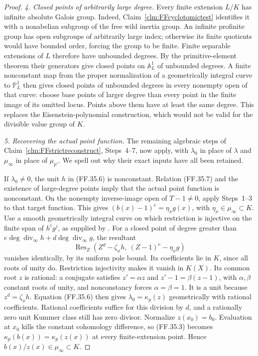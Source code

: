 \begin{proof}
\emph{4. Closed points of arbitrarily large degree.}
Every finite extension \(L/K\) has infinite
absolute Galois group. Indeed,
Claim~\ref{clm:FFcyclotomictest} identifies it
with a nonabelian subgroup of the free wild
inertia group. An infinite profinite group
has open subgroups of arbitrarily large
index; otherwise its finite quotients would
have bounded order, forcing the group to
be finite. Finite separable extensions of
\(L\) therefore have unbounded degrees.
By the primitive-element theorem their
generators give closed points on
\(\mathbb A^1_L\) of unbounded degrees.
A finite nonconstant map from the proper
normalization of a geometrically integral
curve to \(\mathbb P^1_L\) then gives
closed points of unbounded degrees in
every nonempty open of that curve: choose
base points of larger degree than every
point in the finite image of its omitted
locus. Points above them have at least
the same degree. This replaces the
Eisenstein-polynomial construction, which
would not be valid for the divisible
value group of \(K\).

\emph{5. Recovering the actual point function.}
The remaining algebraic steps of
Claim~\ref{clm:FFstrictreconstruct}, Steps~4--7,
now apply, with \(\lambda_0\) in place of
\(\lambda\) and \(\mu_\infty\) in place of
\(\mu_{p'}\). We spell out why their exact
inputs have all been retained.

If \(\lambda_0\ne0\), the unit \(h\) in
(FF.35.6) is nonconstant. Relation (FF.35.7)
and the existence of large-degree points
imply that the actual point function is
nonconstant. On the nonempty inverse-image
open of \(T-1\ne0\), apply Steps~1--3 to
that target function. This gives
\((b(x)-1)^e=\eta_xg(x)\), with
\(\eta_x\in\mu_\infty\subset K\).
Use a smooth geometrically integral curve
on which restriction is injective on the
finite span of \(h^ig^j\), as supplied by
\citet[Theorem~1.8 and Corollary~1.9]{FF_CharlesPoonen2016}.
For a closed point of degree greater than
\(e\deg\operatorname{div}_\infty h+
d\deg\operatorname{div}_\infty g\), the
resultant
\[
        \operatorname{Res}_Z
          (Z^d-\zeta_xh,\ (Z-1)^e-\eta_xg)
\]
vanishes identically, by its uniform pole
bound. Its coefficients lie in \(K\),
since all roots of unity do. Restriction
injectivity makes it vanish in \(K(X)\).
Its common root \(z\) is rational: a
conjugate satisfies \(z'=\alpha z\) and
\(z'-1=\beta(z-1)\), with \(\alpha,\beta\)
constant roots of unity, and nonconstancy
forces \(\alpha=\beta=1\). It is a unit
because \(z^d=\zeta_xh\).
Equation (FF.35.6) then gives
\(\lambda_0=\kappa_p(z)\) geometrically
with rational coefficients. Rational
coefficients suffice for this division
by \(d\), and a rationally zero unit
Kummer class still has zero divisor.
Normalize \(z(x_0)=b_0\). Evaluation at
\(x_0\) kills the constant cohomology
difference, so (FF.35.3) becomes
\(\kappa_p(b(x))=\kappa_p(z(x))\)
at every finite-extension point. Hence
\(b(x)/z(x)\in\mu_\infty\subset K\).


\end{proof}
